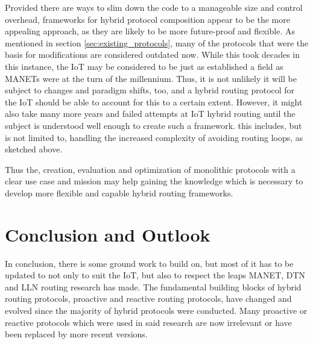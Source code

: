 \documentclass[a4paper,10pt]{scrartcl}
\begin{document}
Provided there are ways to slim down the code to a manageable size and control overhead, frameworks for hybrid protocol composition appear to be the more appealing approach, as they are likely to be more future-proof and flexible. As mentioned in section \ref{sec:existing_protocols}, many of the protocols that were the basis for modifications are considered outdated now. While this took decades in this instance, the IoT may be considered to be just as established a field as MANETs were at the turn of the millennium. Thus, it is not unlikely it will be subject to changes and paradigm shifts, too, and a hybrid routing protocol for the IoT should be able to account for this to a certain extent. However, it might also take many more years and failed attempts at IoT hybrid routing until the subject is understood well enough to create such a framework. this includes, but is not limited to, handling the increased complexity of avoiding routing loops, as sketched above.

Thus the, creation, evaluation and optimization of monolithic protocols with a clear use case and mission may help gaining the knowledge which is necessary to develop more flexible and capable hybrid routing frameworks.


\section{Conclusion and Outlook}
\label{sec:conclusion}
In conclusion, there is some ground work to build on, but most of it has to be updated to not only to suit the IoT, but also to respect the leaps MANET, DTN and LLN routing research has made. The fundamental building blocks of hybrid routing protocols, proactive and reactive routing protocols, have changed and evolved since the majority of hybrid protocols were conducted. Many proactive or reactive protocols which were used in said research are now irrelevant or have been replaced by more recent versions.\\
\end{document}
